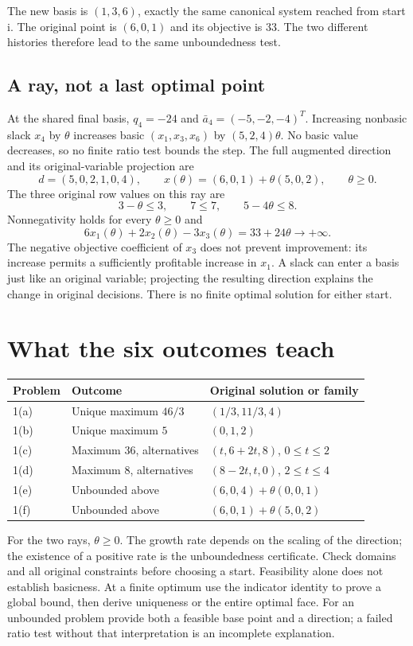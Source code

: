 \documentclass[11pt,a4paper]{article}
\begin{document}
The new basis is $(1,3,6)$, exactly the same canonical system reached
from start i. The original point is $(6,0,1)$ and its objective is 33.
The two different histories therefore lead to the same unboundedness test.

\subsection{A ray, not a last optimal point}\label{sec:f-ray}
At the shared final basis, $q_4=-24$ and
$\bar a_4=(-5,-2,-4)^T$. Increasing nonbasic slack $x_4$ by $\theta$
increases basic $(x_1,x_3,x_6)$ by $(5,2,4)\theta$.
No basic value decreases, so no finite ratio test bounds the step.
The full augmented direction and its original-variable projection are
\[
  d=(5,0,2,1,0,4),\qquad
  x(\theta)=(6,0,1)+\theta(5,0,2),\qquad\theta\geq0.
\]
The three original row values on this ray are
\[
  3-\theta\leq3,\qquad 7\leq7,\qquad5-4\theta\leq8.
\]
Nonnegativity holds for every $\theta\geq0$ and
\[
  6x_1(\theta)+2x_2(\theta)-3x_3(\theta)=33+24\theta\longrightarrow+\infty.
\]
The negative objective coefficient of $x_3$ does not prevent improvement:
its increase permits a sufficiently profitable increase in $x_1$.
A slack can enter a basis just like an original variable; projecting the
resulting direction explains the change in original decisions.
There is no finite optimal solution for either start.

\section{What the six outcomes teach}\label{sec:review}
\begin{center}
  \begin{tabular}{lll}\toprule
    Problem & Outcome & Original solution or family\\\midrule
    1(a) & Unique maximum $46/3$ & $(1/3,11/3,4)$\\
    1(b) & Unique maximum $5$ & $(0,1,2)$\\
    1(c) & Maximum $36$, alternatives & $(t,6+2t,8)$, $0\leq t\leq2$\\
    1(d) & Maximum $8$, alternatives & $(8-2t,t,0)$, $2\leq t\leq4$\\
    1(e) & Unbounded above & $(6,0,4)+\theta(0,0,1)$\\
    1(f) & Unbounded above & $(6,0,1)+\theta(5,0,2)$\\\bottomrule
  \end{tabular}
\end{center}
For the two rays, $\theta\geq0$. The growth rate depends on the scaling of
the direction; the existence of a positive rate is the unboundedness certificate.
Check domains and all original constraints before choosing a start. Feasibility
alone does not establish basicness. At a finite optimum use the indicator
identity to prove a global bound, then derive uniqueness or the entire optimal
face. For an unbounded problem provide both a feasible base point and a direction;
a failed ratio test without that interpretation is an incomplete explanation.
\end{document}
